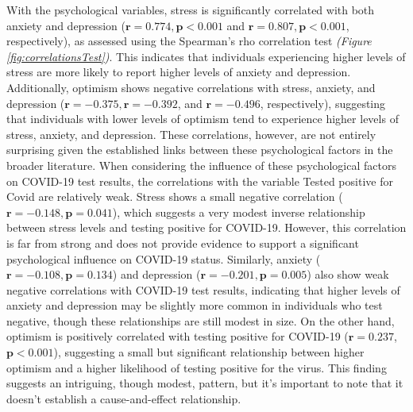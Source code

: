 \documentclass[a4paper]{article}
\begin{document}
\vspace{3em}
\noindent
With the psychological variables, stress is significantly correlated with both anxiety and depression (\(\boldsymbol{r = 0.774, p < 0.001}\) and \(\boldsymbol{r = 0.807, p < 0.001}\), respectively),
as assessed using the Spearman's rho correlation test \textit{(Figure \ref{fig:correlationsTest})}.\newline
This indicates that individuals experiencing higher levels of stress are more likely to report higher levels of anxiety and depression.
Additionally, optimism shows negative correlations with stress, anxiety, and depression (\(\boldsymbol{r = -0.375, r = -0.392}\), and \(\boldsymbol{r = -0.496}\), respectively),
suggesting that individuals with lower levels of optimism tend to experience higher levels of stress, anxiety, and depression.
\vspace{0.5em}\newline
These correlations, however, are not entirely surprising given the established links between these psychological factors in the broader literature.
\vspace{0.5em}\newline
When considering the influence of these psychological factors on COVID-19 test results, the correlations with the variable Tested positive for Covid are relatively weak.\newline
Stress shows a small negative correlation (\(\boldsymbol{r = -0.148, p = 0.041}\)), which suggests a very modest inverse relationship between stress levels and testing positive for COVID-19.
However, this correlation is far from strong and does not provide evidence to support a significant psychological influence on COVID-19 status.\newline
Similarly, anxiety (\(\boldsymbol{r = -0.108, p = 0.134}\)) and depression (\(\boldsymbol{r = -0.201, p = 0.005}\)) also show weak negative correlations with COVID-19 test results,
indicating that higher levels of anxiety and depression may be slightly more common in individuals who test negative, though these relationships are still modest in size.
\vspace{0.5em}\newline
On the other hand, optimism is positively correlated with testing positive for COVID-19 (\(\boldsymbol{r = 0.237}\), \(\boldsymbol{p < 0.001}\)), suggesting a small but significant relationship between higher optimism and a higher likelihood of testing positive for the virus.\newline
This finding suggests an intriguing, though modest, pattern, but it’s important to note that it doesn’t establish a cause-and-effect relationship.
\end{document}
